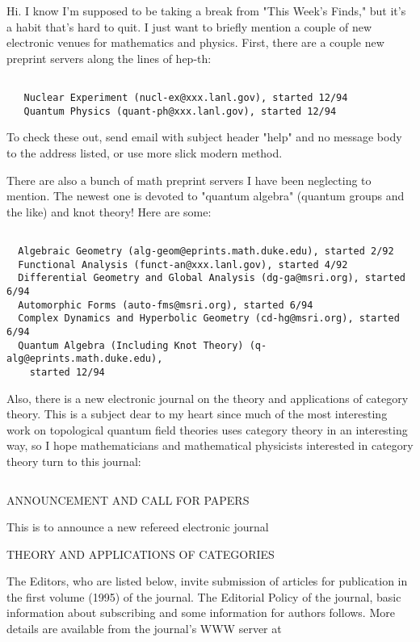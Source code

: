 

Hi.  I know I'm supposed to be taking a break from "This Week's Finds,"
but it's a habit that's hard to quit.  I just want to briefly mention a
couple of new electronic venues for mathematics and physics.  First,
there are a couple new preprint servers along the lines of hep-th:


\begin{verbatim}

   Nuclear Experiment (nucl-ex@xxx.lanl.gov), started 12/94 
   Quantum Physics (quant-ph@xxx.lanl.gov), started 12/94 
\end{verbatim}
    

To check these out, send email with subject header "help" and no message
body to the address listed, or use more slick modern method.

There are also a bunch of math preprint servers I have been neglecting
to mention.  The newest one is devoted to "quantum algebra" (quantum
groups and the like) and knot theory!  Here are some:


\begin{verbatim}

  Algebraic Geometry (alg-geom@eprints.math.duke.edu), started 2/92 
  Functional Analysis (funct-an@xxx.lanl.gov), started 4/92
  Differential Geometry and Global Analysis (dg-ga@msri.org), started 6/94 
  Automorphic Forms (auto-fms@msri.org), started 6/94 
  Complex Dynamics and Hyperbolic Geometry (cd-hg@msri.org), started 6/94 
  Quantum Algebra (Including Knot Theory) (q-alg@eprints.math.duke.edu),
    started 12/94 
\end{verbatim}
    

Also, there is a new electronic journal on the theory and applications
of category theory.  This is a subject dear to my heart since much of
the most interesting work on topological quantum field theories uses
category theory in an interesting way, so I hope mathematicians and
mathematical physicists interested in category theory turn to this
journal:


               

$$

               ANNOUNCEMENT AND CALL FOR PAPERS
 
       This is to announce a new refereed electronic journal
 
 
            THEORY AND APPLICATIONS OF CATEGORIES
 
 
The Editors, who are listed below, invite submission of articles 
for publication in the first volume (1995) of the journal.   
The Editorial Policy of the journal, basic information about 
subscribing and some information for authors follows. 
More details are available from the journal's WWW server at
 
